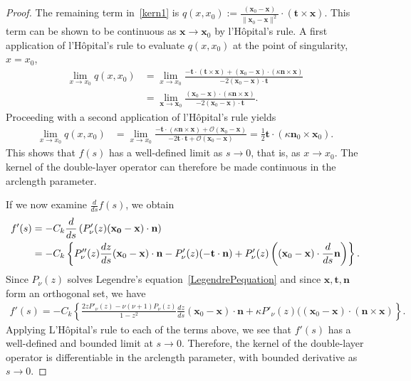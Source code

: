 \begin{proof}
The remaining term in~\eqref{kern1} is $q(x,x_0) :=
\frac{(\mathbf{x}_{0}-\mathbf{x})}{\|\mathbf{x}_{0}-\mathbf{x}\|^2}
\cdot \left( \mathbf{t} \times \mathbf{x} \right).$  This term can be
shown to be continuous as $\mathbf{x} \rightarrow \mathbf{x}_{0}$ by
l'H\^{o}pital's rule.  A first application of l'H\^{o}pital's rule to
evaluate $q(x,x_0)$ at the point of singularity, $x = x_{0}$, 
\begin{align*}
  \lim_{x \rightarrow x_{0}}q(x,x_{0}) & = 
  \lim_{x \rightarrow x_{0}} 
  \frac{ -\mathbf{t} \cdot \left(\mathbf{t} \times \mathbf{x} \right)
  + (\mathbf{x}_{0}-\mathbf{x}) \cdot \left( \kappa \mathbf{n}
  \times \mathbf{x} \right)}
  {-2(\mathbf{x}_{0} - \mathbf{x}) \cdot \mathbf{t}} \\
  & = \lim_{\mathbf{x} \rightarrow \mathbf{x}_{0}} 
  \frac{(\mathbf{x}_{0}-\mathbf{x}) \cdot \left(
  \kappa\mathbf{n} \times \mathbf{x}\right)}
  {-2(\mathbf{x}_{0} - \mathbf{x}) \cdot \mathbf{t}}. 
\end{align*}
Proceeding with a second application of l'H\^{o}pital's rule yields
\begin{align*}
  \lim_{x \rightarrow x_{0}} q(x,x_0)  
  & = \lim_{x \rightarrow x_{0}} \frac{-\mathbf{t} \cdot 
  \left( \kappa \mathbf{n} \times \mathbf{x} \right) +
  \mathcal{O}(\mathbf{x}_{0}-\mathbf{x})}
  {-2\mathbf{t} \cdot \mathbf{t} + \mathcal{O}(\mathbf{x}_{0}-\mathbf{x})}
  = \frac{1}{2} \mathbf{t} \cdot \left( \kappa \mathbf{n}_{0} \times 
  \mathbf{x}_{0} \right).
\end{align*}
This shows that $f(s)$ has a well-defined limit as $s\rightarrow 0$,
that is, as $x \rightarrow x_0$. The kernel of the double-layer operator
can therefore be made continuous in the arclength parameter.

If we now examine $\frac{d}{ds}f(s)$, we obtain
\begin{align*} 
  f'(s)&= -C_k \frac{d}{ds}\left( P'_\nu(z)(\mathbf{x_0}-\mathbf{x}) \cdot 
    \mathbf{n} \right) \\
  &=-C_{k} \left\{P''_{\nu}(z) \frac{dz}{ds}
    (\mathbf{x}_{0}-\mathbf{x})  \cdot \mathbf{n} - P'_{\nu}(z)
    (-\mathbf{t} \cdot \mathbf{n}) + P'_\nu(z)\left((\mathbf{x}_{0} -
    \mathbf{x}) \cdot \frac{d}{ds}\mathbf{n}\right)\right\}.
 \end{align*}
Since $P_\nu(z)$ solves Legendre's equation~\eqref{LegendrePequation}
and since $\mathbf{x},\mathbf{t}, \mathbf{n}$ form an orthogonal set,
we have
\begin{align*}
  f'(s) =-C_k \left\{\frac{2zP'_{\nu}(z)-\nu(\nu+1)P_{\nu}(z)}{1-z^2}
  \frac{dz}{ds}(\mathbf{x}_{0}-\mathbf{x})\cdot \mathbf{n} + \kappa
  P'_\nu(z)((\mathbf{x}_{0}-\mathbf{x})\cdot (\mathbf{n} \times 
  \mathbf{x})\right\}.
\end{align*}
Applying L'H\^{o}pital's rule to each of the terms above, we see that
$f'(s)$ has a well-defined and bounded limit at $s \rightarrow 0$.
Therefore, the kernel of the double-layer operator is differentiable in
the arclength parameter, with bounded derivative as $s \rightarrow 0$. 


\end{proof}
